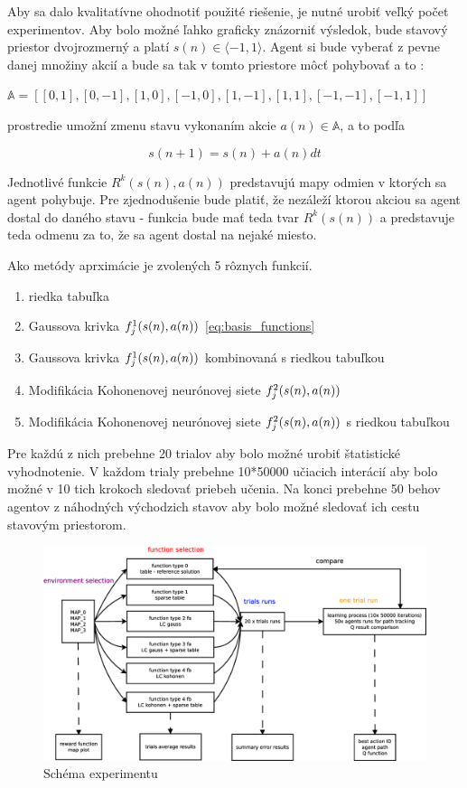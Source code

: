 Aby sa dalo kvalitatívne ohodnotiť použité riešenie, je nutné urobiť veľký počet experimentov.
Aby bolo možné ľahko graficky znázorniť výsledok, bude stavový priestor dvojrozmerný a platí
$s(n) \in \langle -1, 1 \rangle$.
Agent si bude vyberať z pevne danej množiny akcií a bude sa tak v tomto priestore môcť pohybovať a to :

$\mathbb{A} = [ [0, 1], [0, -1], [1,  0], [-1, 0], [1, -1], [1, 1], [-1, -1], [-1, 1]] $

prostredie umožní zmenu stavu vykonaním akcie $a(n) \in \mathbb{A}$, a to podľa

\begin{equation}
s(n+1) = s(n) + a(n){dt}
\label{eq:q_learning_next_state}
\end{equation}

Jednotlivé funkcie $R^k(s(n), a(n))$ predstavujú mapy odmien v ktorých sa agent pohybuje. Pre zjednodušenie
bude platiť, že nezáleží ktorou akciou sa agent dostal do daného stavu - funkcia bude
mať teda tvar $R^k(s(n))$ a predstavuje teda odmenu za to, že sa agent dostal na nejaké miesto.

Ako metódy aprximácie je zvolených 5 rôznych funkcií.

\begin{enumerate}
\item riedka tabuľka
\item Gaussova krivka $f_j^1(\boldmath{s(n), a(n)})$ \ref{eq:basis_functions}
\item Gaussova krivka $f_j^1(\boldmath{s(n), a(n)})$ kombinovaná s riedkou tabuľkou
\item Modifikácia Kohonenovej neurónovej siete $f_j^2(\boldmath{s(n), a(n)})$
\item Modifikácia Kohonenovej neurónovej siete $f_j^2(\boldmath{s(n), a(n)})$ s riedkou tabuľkou
\end{enumerate}

Pre každú z nich prebehne 20 trialov aby bolo možné urobiť štatistické vyhodnotenie.
V každom trialy prebehne 10*50000 učiacich interácií aby bolo možné v 10 tich krokoch sledovať
priebeh učenia. Na konci prebehne 50 behov agentov z náhodných východzich stavov aby bolo
možné sledovať ich cestu stavovým priestorom.

\begin{figure}[!htb]
\center
\includegraphics[scale=.3]{../diagrams/experiment_map_q_learning.eps}
\caption{Schéma experimentu}
\label{img:experiment_schem}
\end{figure}

